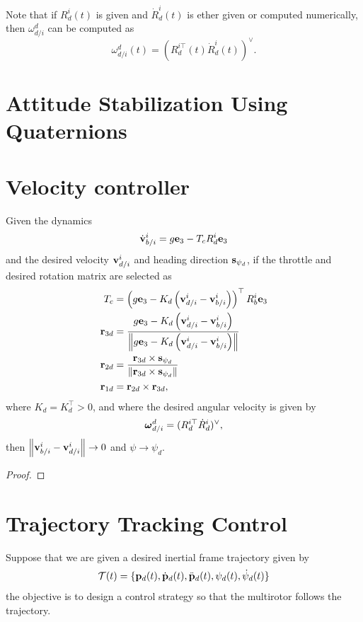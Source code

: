 Note that if $R_d^i(t)$ is given and $\dot{R}_d^i(t)$ is ether given or computed numerically, then $\omega_{d/i}^d$ can be computed as
\[
\omega_{d/i}^d(t) = \left( R_d^{i\top}(t) \dot{R}_d^i(t) \right)^\vee.
\]


\section{Attitude Stabilization Using Quaternions}



\section{Velocity controller}
\label{sec:velocity_controller}

\begin{theorem}
	Given the dynamics 
	\[
	\dot{\mathbf{v}}_{b/i}^i = g\mathbf{e}_3 - T_c R_d^i\mathbf{e}_3
	\]
	and the desired velocity $\mathbf{v}_{d/i}^i$ and heading direction $\mathbf{s}_{\psi_d}$,
	if the throttle and desired rotation matrix are selected as
	\begin{align*}
		T_c &= \left(g\mathbf{e}_3 - K_d\left(\mathbf{v}_{d/i}^i-\mathbf{v}_{b/i}^i\right)\right)^\top R_b^i\mathbf{e}_3 \\
		\mathbf{r}_{3d} &= \frac{g\mathbf{e}_3 - K_d\left(\mathbf{v}_{d/i}^i-\mathbf{v}_{b/i}^i\right)}{\left\|g\mathbf{e}_3 - K_d\left(\mathbf{v}_{d/i}^i-\mathbf{v}_{b/i}^i\right)\right\|} \\
		\mathbf{r}_{2d} &= \frac{\mathbf{r}_{3d} \times \mathbf{s}_{\psi_d}}{\left\|\mathbf{r}_{3d} \times \mathbf{s}_{\psi_d}\right\|} \\
		\mathbf{r}_{1d} &= \mathbf{r}_{2d} \times \mathbf{r}_{3d},
	\end{align*}
	where $K_d=K_d^\top > 0$, and where the desired angular velocity is given by
	\[
	\boldsymbol{\omega}_{d/i}^d = (R_d^{i\top}\dot{R}_d^{i})^\vee,
	\]
	then $\left\|\mathbf{v}_{b/i}^i - \mathbf{v}_{d/i}^i\right\| \to 0$ and $\psi \to \psi_d$.
\end{theorem}

\begin{proof}
\end{proof}



\section{Trajectory Tracking Control}
Suppose that we are given a desired inertial frame trajectory given by
\[
\mathcal{T}(t) = \{ \mathbf{p}_d(t), \dot{\mathbf{p}}_d(t), \ddot{\mathbf{p}}_d(t), \psi_d(t), \dot{\psi}_d(t) \}
\]
the objective is to design a control strategy so that the multirotor follows the trajectory.



